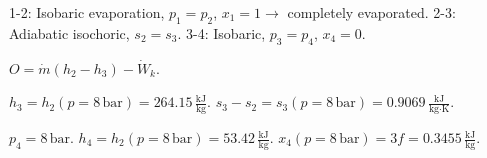 1-2: Isobaric evaporation, \( p_1 = p_2 \), \( x_1 = 1 \rightarrow \) completely evaporated.  
2-3: Adiabatic isochoric, \( s_2 = s_3 \).  
3-4: Isobaric, \( p_3 = p_4 \), \( x_4 = 0 \).  

\( O = \dot{m} (h_2 - h_3) - \dot{W}_k \).  

\( h_3 = h_2 (p = 8 \, \text{bar}) = 264.15 \, \frac{\text{kJ}}{\text{kg}} \).  
\( s_3 - s_2 = s_3 (p = 8 \, \text{bar}) = 0.9069 \, \frac{\text{kJ}}{\text{kg·K}} \).  

\( p_4 = 8 \, \text{bar} \).  
\( h_4 = h_2 (p = 8 \, \text{bar}) = 53.42 \, \frac{\text{kJ}}{\text{kg}} \).  
\( x_4 (p = 8 \, \text{bar}) = 3f = 0.3455 \, \frac{\text{kJ}}{\text{kg}} \).